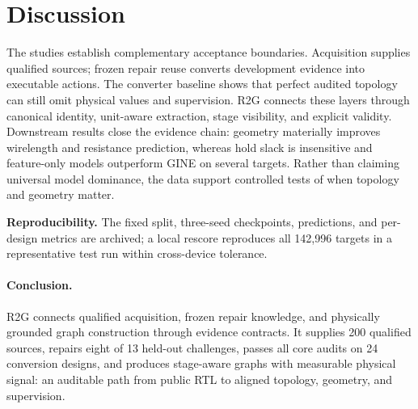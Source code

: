 \section{Discussion}
The studies establish complementary acceptance boundaries. Acquisition supplies qualified sources; frozen repair reuse converts development evidence into executable actions. The converter baseline shows that perfect audited topology can still omit physical values and supervision. R2G connects these layers through canonical identity, unit-aware extraction, stage visibility, and explicit validity. Downstream results close the evidence chain: geometry materially improves wirelength and resistance prediction, whereas hold slack is insensitive and feature-only models outperform GINE on several targets. Rather than claiming universal model dominance, the data support controlled tests of when topology and geometry matter.

\textbf{Reproducibility.} The fixed split, three-seed checkpoints, predictions, and per-design metrics are archived; a local rescore reproduces all 142,996 targets in a representative test run within cross-device tolerance.

\paragraph{Conclusion.} R2G connects qualified acquisition, frozen repair knowledge, and physically grounded graph construction through evidence contracts. It supplies 200 qualified sources, repairs eight of 13 held-out challenges, passes all core audits on 24 conversion designs, and produces stage-aware graphs with measurable physical signal: an auditable path from public RTL to aligned topology, geometry, and supervision.

